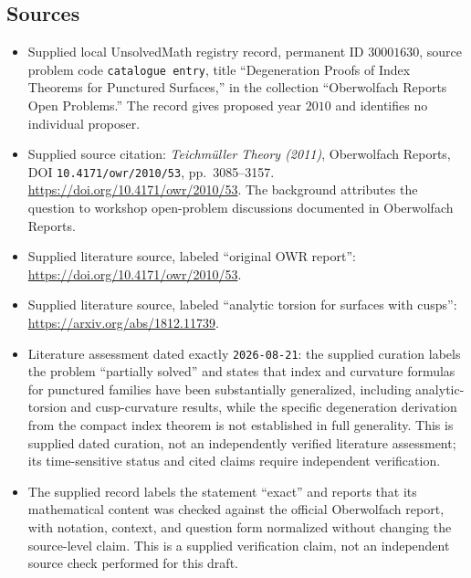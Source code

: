 \documentclass[11pt]{article}
\begin{document}
\subsection{Sources}
\begin{itemize}
\item Supplied local UnsolvedMath registry record, permanent ID \(30001630\), source problem code \texttt{catalogue entry}, title ``Degeneration Proofs of Index Theorems for Punctured Surfaces,'' in the collection ``Oberwolfach Reports Open Problems.'' The record gives proposed year \(2010\) and identifies no individual proposer.
\item Supplied source citation: \emph{Teichmüller Theory (2011)}, Oberwolfach Reports, DOI \texttt{10.4171/owr/2010/53}, pp.\ 3085--3157. \url{https://doi.org/10.4171/owr/2010/53}. The background attributes the question to workshop open-problem discussions documented in Oberwolfach Reports.
\item Supplied literature source, labeled ``original OWR report'': \url{https://doi.org/10.4171/owr/2010/53}.
\item Supplied literature source, labeled ``analytic torsion for surfaces with cusps'': \url{https://arxiv.org/abs/1812.11739}.
\item Literature assessment dated exactly \texttt{2026-08-21}: the supplied curation labels the problem ``partially solved'' and states that index and curvature formulas for punctured families have been substantially generalized, including analytic-torsion and cusp-curvature results, while the specific degeneration derivation from the compact index theorem is not established in full generality. This is supplied dated curation, not an independently verified literature assessment; its time-sensitive status and cited claims require independent verification.
\item The supplied record labels the statement ``exact'' and reports that its mathematical content was checked against the official Oberwolfach report, with notation, context, and question form normalized without changing the source-level claim. This is a supplied verification claim, not an independent source check performed for this draft.
\end{itemize}
\end{document}
